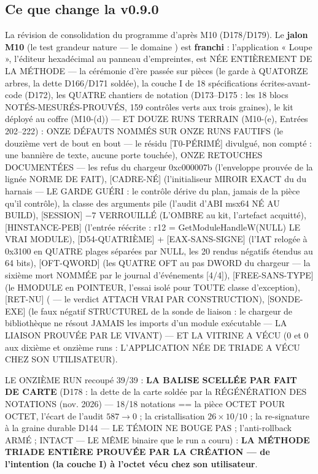 \subsection{Ce que change la v0.9.0}\label{sec:nouveautes090}

La révision de consolidation du programme d'après M10 (D178/D179). Le \textbf{jalon
M10} (le test grandeur nature — le domaine ) est \textbf{franchi} :
l'application « Loupe », l'éditeur hexadécimal au panneau d'empreintes, est NÉE
ENTIÈREMENT DE LA MÉTHODE — la cérémonie d'ère passée sur pièces (le garde à
QUATORZE arbres, la dette D166/D171 soldée), la couche I de 18 spécifications
écrites-avant-code (D172), les QUATRE chantiers de notation (D173–D175 : les 18
blocs NOTÉS-MESURÉS-PROUVÉS, 159 contrôles verts aux trois graines), le kit déployé
au coffre  (M10-(d)) — ET DOUZE RUNS TERRAIN (M10-(e), Entrées 202–222) :
ONZE DÉFAUTS NOMMÉS SUR ONZE RUNS FAUTIFS (le douzième vert de bout en bout —
le résidu [T0-PÉRIMÉ] divulgué, non compté : une bannière de texte, aucune
porte touchée), ONZE RETOUCHES DOCUMENTÉES — les refus du chargeur
0xc000007b (l'enveloppe prouvée de la lignée NORME DE FAIT), [CADRE-NÉ]
(l'initialiseur  MIROIR EXACT du  du harnais — LE
GARDE GUÉRI : le contrôle dérive du plan, jamais de la pièce qu'il contrôle), la
classe des arguments pile (l'audit d'ABI msx64 NÉ AU BUILD), [SESSION] $-7$
VERROUILLÉ (L'OMBRE au kit, l'artefact acquitté), [HINSTANCE-PEB] (l'entrée
réécrite : r12 = GetModuleHandleW(NULL) LE VRAI MODULE), [D54-QUATRIÈME] +
[EAX-SANS-SIGNE] (l'IAT relogée à 0x3100 en QUATRE plages séparées par NULL, les 20
rendus négatifs étendus au 64 bits), [OFT-QWORD] (les QUATRE OFT au pas DWORD du
chargeur — la sixième mort NOMMÉE par le journal d'événements [4/4]),
[FREE-SANS-TYPE] (le HMODULE en POINTEUR, l'essai isolé pour TOUTE classe
d'exception), [RET-NU] ( — le verdict ATTACH VRAI PAR
CONSTRUCTION), [SONDE-EXE] (le faux négatif STRUCTUREL de la sonde de liaison : le
chargeur de bibliothèque ne résout JAMAIS les imports d'un module exécutable — LA
LIAISON PROUVÉE PAR LE VIVANT) — ET LA VITRINE A VÉCU (0 et 0 aux dixième et
onzième runs : L'APPLICATION NÉE DE TRIADE A VÉCU CHEZ SON UTILISATEUR).

LE ONZIÈME RUN recoupé 39/39 : \textbf{LA BALISE  SCELLÉE PAR
FAIT DE CARTE} (D178 : la dette de la carte soldée par la RÉGÉNÉRATION DES
NOTATIONS (nov. 2026) — 18/18 notations == la pièce OCTET POUR
OCTET, l'écart de l'audit
$587 \to 0$ ; la cristallisation $26 \times 10/10$ ; la re-signature à la graine
durable D144 — LE TÉMOIN NE BOUGE PAS ; l'anti-rollback ARMÉ ; 
INTACT  — LE MÊME binaire que le run a couru) : \textbf{LA MÉTHODE
TRIADE ENTIÈRE PROUVÉE PAR LA CRÉATION — de l'intention (la couche I) à l'octet
vécu chez son utilisateur}.

